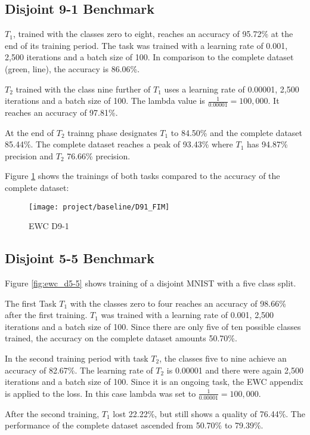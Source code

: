 \subsection{Disjoint 9-1 Benchmark}

$T_1$, trained with the classes zero to eight, reaches an accuracy of 95.72\% at the end of its training period.
The task was trained with a learning rate of 0.001, 2,500 iterations and a batch size of 100.
In comparison to the complete dataset (green, line), the accuracy is 86.06\%.

$T_2$ trained with the class nine further of $T_1$ uses a learning rate of 0.00001, 2,500 iterations and a batch size of 100.
The lambda value is $\frac{1}{0.00001} = 100,000$.
It reaches an accuracy of 97.81\%.

At the end of $T_2$ trainng phase designates $T_1$ to 84.50\% and the complete dataset 85.44\%.
The complete dataset reaches a peak of 93.43\% where $T_1$ has 94.87\% precision and $T_2$ 76.66\% precision.

Figure \ref{fig:ewc_d9-1} shows the trainings of both tasks compared to the accuracy of the complete dataset:

\begin{figure}[H]
    \centering
    \texttt{[image: project/baseline/D91\_FIM]}
    \caption{EWC D9-1}
    \label{fig:ewc_d9-1}
\end{figure}

\subsection{Disjoint 5-5 Benchmark}

Figure \ref{fig:ewc_d5-5} shows training of a disjoint MNIST with a five class split.

The first Task $T_1$ with the classes zero to four reaches an accuracy of 98.66\% after the first training.
$T_1$ was trained with a learning rate of 0.001, 2,500 iterations and a batch size of 100.
Since there are only five of ten possible classes trained, the accuracy on the complete dataset amounts 50.70\%.

In the second training period with task $T_2$, the classes five to nine achieve an accuracy of 82.67\%.
The learning rate of $T_2$ is 0.00001 and there were again 2,500 iterations and a batch size of 100.
Since it is an ongoing task, the EWC appendix is applied to the loss.
In this case lambda was set to $\frac{1}{0.00001} = 100,000$.

After the second training, $T_1$ lost 22.22\%, but still shows a quality of 76.44\%.
The performance of the complete dataset ascended from 50.70\% to 79.39\%.

